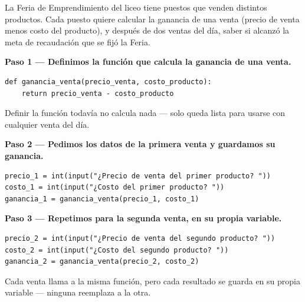 \documentclass[11pt]{article}
\begin{document}
\begin{estrategiabox}

La Feria de Emprendimiento del liceo tiene puestos que venden distintos productos. Cada puesto quiere calcular la ganancia de una venta (precio de venta menos costo del producto), y después de dos ventas del día, saber si alcanzó la meta de recaudación que se fijó la Feria.

\vspace{2mm}
\textbf{Paso 1 --- Definimos la función que calcula la ganancia de una venta.}

\begin{cajacodigo}
\begin{Verbatim}[fontsize=\small]
def ganancia_venta(precio_venta, costo_producto):
    return precio_venta - costo_producto
\end{Verbatim}
\end{cajacodigo}
Definir la función todavía no calcula nada --- solo queda lista para usarse con cualquier venta del día.

\vspace{2mm}
\textbf{Paso 2 --- Pedimos los datos de la primera venta y guardamos su ganancia.}

\begin{cajacodigo}
\begin{Verbatim}[fontsize=\small]
precio_1 = int(input("¿Precio de venta del primer producto? "))
costo_1 = int(input("¿Costo del primer producto? "))
ganancia_1 = ganancia_venta(precio_1, costo_1)
\end{Verbatim}
\end{cajacodigo}

\vspace{2mm}
\textbf{Paso 3 --- Repetimos para la segunda venta, en su propia variable.}

\begin{cajacodigo}
\begin{Verbatim}[fontsize=\small]
precio_2 = int(input("¿Precio de venta del segundo producto? "))
costo_2 = int(input("¿Costo del segundo producto? "))
ganancia_2 = ganancia_venta(precio_2, costo_2)
\end{Verbatim}
\end{cajacodigo}
Cada venta llama a la misma función, pero cada resultado se guarda en su propia variable --- ninguna reemplaza a la otra.


\end{estrategiabox}
\end{document}
